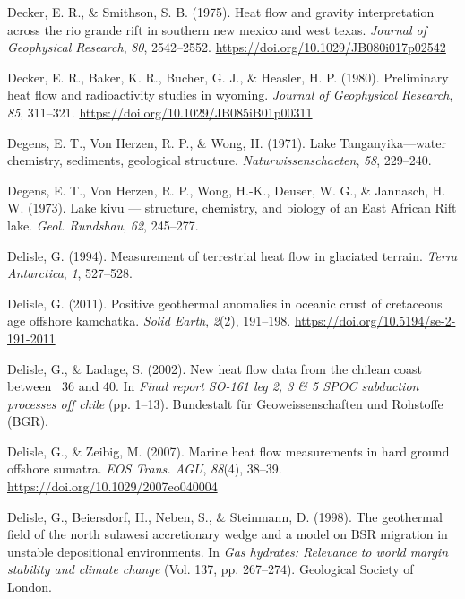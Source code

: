 \begin{CSLReferences}{1}{1}
\leavevmode{}%
Decker, E. R., \& Smithson, S. B. (1975). Heat flow and gravity interpretation across the rio grande rift in southern new mexico and west texas. \emph{Journal of Geophysical Research}, \emph{80}, 2542--2552. \url{https://doi.org/10.1029/JB080i017p02542}

\leavevmode{}%
Decker, E. R., Baker, K. R., Bucher, G. J., \& Heasler, H. P. (1980). Preliminary heat flow and radioactivity studies in wyoming. \emph{Journal of Geophysical Research}, \emph{85}, 311--321. \url{https://doi.org/10.1029/JB085iB01p00311}

\leavevmode{}%
Degens, E. T., Von Herzen, R. P., \& Wong, H. (1971). Lake {Tanganyika}---water chemistry, sediments, geological structure. \emph{Naturwissenschaeten}, \emph{58}, 229--240.

\leavevmode{}%
Degens, E. T., Von Herzen, R. P., Wong, H.-K., Deuser, W. G., \& Jannasch, H. W. (1973). Lake kivu --- structure, chemistry, and biology of an {East African Rift} lake. \emph{Geol. Rundshau}, \emph{62}, 245--277.

\leavevmode{}%
Delisle, G. (1994). Measurement of terrestrial heat flow in glaciated terrain. \emph{Terra Antarctica}, \emph{1}, 527--528.

\leavevmode{}%
Delisle, G. (2011). Positive geothermal anomalies in oceanic crust of cretaceous age offshore kamchatka. \emph{Solid Earth}, \emph{2}(2), 191--198. \url{https://doi.org/10.5194/se-2-191-2011}

\leavevmode{}%
Delisle, G., \& Ladage, S. (2002). New heat flow data from the chilean coast between ~36\textdegree{} and 40\textdegree{}. In \emph{Final report SO-161 leg 2, 3 \& 5 SPOC subduction processes off chile} (pp. 1--13). Bundestalt für Geoweissenschaften und Rohstoffe (BGR).

\leavevmode{}%
Delisle, G., \& Zeibig, M. (2007). Marine heat flow measurements in hard ground offshore sumatra. \emph{EOS Trans. AGU}, \emph{88}(4), 38--39. \url{https://doi.org/10.1029/2007eo040004}

\leavevmode{}%
Delisle, G., Beiersdorf, H., Neben, S., \& Steinmann, D. (1998). The geothermal field of the north sulawesi accretionary wedge and a model on BSR migration in unstable depositional environments. In \emph{Gas hydrates: Relevance to world margin stability and climate change} (Vol. 137, pp. 267--274). Geological Society of London.


\end{CSLReferences}
